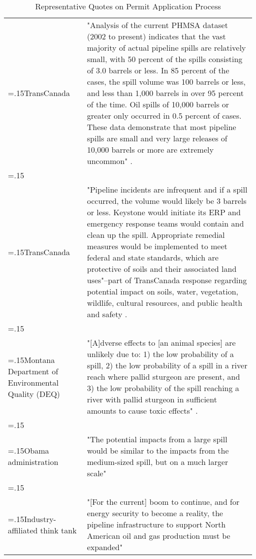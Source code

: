 \begin{landscape}
\begin{table}[H]
	\caption{Representative Quotes on Permit Application Process}

	\begin{tabularx}{\linewidth}{>{\raggedright\hsize=.15\hsize}X X}
		\toprule

		TransCanada & 
		"Analysis of the current PHMSA dataset (2002 to present) indicates that the vast majority of actual pipeline spills are relatively small, with 50 percent of the spills consisting of 3.0 barrels or less. In 85 percent of the cases, the spill volume was 100 barrels or less, and less than 1,000 barrels in over 95 percent of the time. Oil spills of 10,000 barrels or greater only occurred in 0.5 percent of cases. These data demonstrate that most pipeline spills are small and very large releases of 10,000 barrels or more are extremely uncommon" \citep[p. 1-34]{TransCanadaKeystone2008}.\\\\

		TransCanada & "Pipeline incidents are infrequent and if a spill occurred, the volume would likely be 3 barrels or less. Keystone would initiate its ERP and emergency response teams would contain and clean up the spill. Appropriate remedial measures would be implemented to meet federal and state standards, which are protective of soils and their associated land uses"--part of TransCanada response regarding potential impact on soils, water, vegetation, wildlife, cultural resources, and public health and safety \citep[pp. 30, 31, 32, 33, 34, and 35]{TransCanadaKeystone2009}.\\\\

		Montana Department of Environmental Quality (DEQ) & "[A]dverse effects to [an animal species] are unlikely due to: 1) the low probability of a spill, 2) the low probability of a spill in a river reach where pallid sturgeon are present, and 3) the low probability of the spill reaching a river with pallid sturgeon in sufficient amounts to cause toxic effects" \citep{MontanaDEQ2012}.\\\\
	
		Obama administration & "The potential impacts  from  a  large  spill  would  be  similar  to  the  impacts  from  the  medium-sized  spill,  but  on  a  much  larger  scale" \citep[ES-18]{DoS2014}\\\\

		Industry-affiliated think tank & "[For the current] boom to continue, and for energy security to become a reality, the pipeline infrastructure to support North American oil and gas production must be expanded" \citep{Weinstein2014}
	\end{tabularx}

\end{table}
\end{landscape}